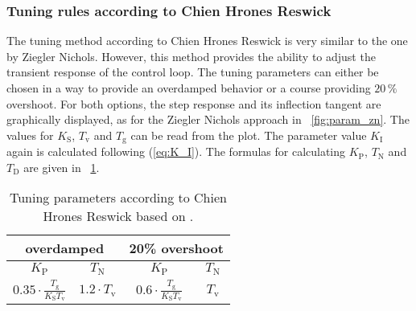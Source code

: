 \subsubsection{Tuning rules according to Chien Hrones Reswick}\label{chap:CHR}
The tuning method according to Chien Hrones Reswick is very similar to the one by Ziegler Nichols. However, this method provides the ability to adjust the transient response of the control loop. The tuning parameters can either be chosen in a way to provide an overdamped behavior or a course providing $20\, \%$ overshoot. \cite{Reg_11}
For both options, the step response and its inflection tangent are graphically displayed, as for the Ziegler Nichols approach in \figurename~\ref{fig:param_zn}.
The values for $K_{\mathrm{S}}$, $T_{\mathrm{v}}$ and $T_{\mathrm{g}}$ can be read from the plot. The parameter value $K_{\mathrm{I}}$ again is calculated following (\ref{eq:K_I}). The formulas for calculating  $K_{\mathrm{P}}$,  $T_{\mathrm{N}}$ and $T_{\mathrm{D}}$ are given in \tablename~\ref{tab:param_chr}.

\begin{table}[ht]
  \centering
  \begin{tabular}{cc|cc}
    \toprule
     \multicolumn{2}{c|}{overdamped} & \multicolumn{2}{c}{20\% overshoot} \\
    \midrule
    $K_{\mathrm{P}}$ &  $T_{\mathrm{N}}$ & $K_{\mathrm{P}}$ &  $T_{\mathrm{N}}$ \\
    \midrule
     $0.35 \cdot \frac{T_{\mathrm{g}}}{K_{\mathrm{S}}T_{\mathrm{v}}}$ & $1.2 \cdot T_{\mathrm{v}}$  & $0.6 \cdot \frac{T_{\mathrm{g}}}{K_{\mathrm{S}}T_{\mathrm{v}}}$ & $T_{\mathrm{v}}$ \\
    \bottomrule
\end{tabular}
  \caption[Tuning parameters according to Chien Hrones Reswick]{Tuning parameters according to Chien Hrones Reswick based on \cite{Reg_17}.}
  \label{tab:param_chr}
\end{table}

